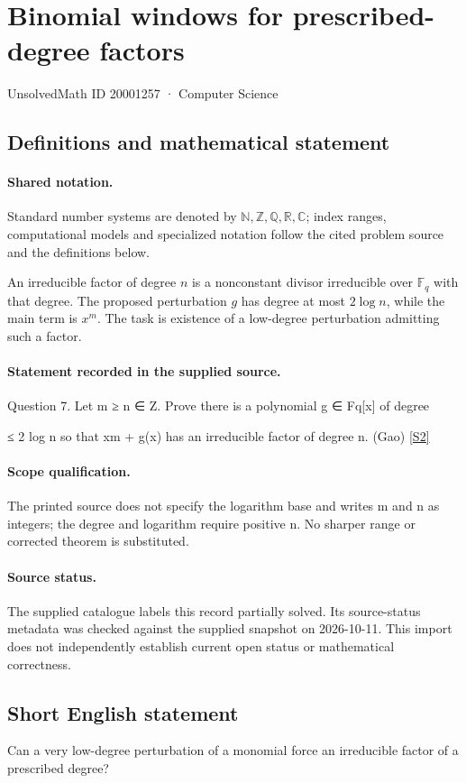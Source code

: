 \documentclass[11pt]{article}
\newcommand{\sref}[2]{\hyperlink{source:#1:#2}{[S#2]}}
\begin{document}
\setcounter{section}{20001256}
\section{Binomial windows for prescribed-degree factors}\label{20001257}
{\small\sffamily UnsolvedMath ID 20001257 · Computer Science}
\subsection{Definitions and mathematical statement}

\paragraph{Shared notation.}Standard number systems are denoted by $\mathbb N,\mathbb Z,\mathbb Q,\mathbb R,\mathbb C$; index ranges, computational models and specialized notation follow the cited problem source and the definitions below.


An irreducible factor of degree $n$ is a nonconstant divisor irreducible over $\mathbb F_q$ with that degree. The proposed perturbation $g$ has degree at most $2\log n$, while the main term is $x^m$. The task is existence of a low-degree perturbation admitting such a factor.
\paragraph{Statement recorded in the supplied source.}
Question 7. Let m ≥ n ∈ Z. Prove there is a polynomial g ∈ Fq[x] of degree

≤ 2 log n so that xm + g(x) has an irreducible factor of degree n. (Gao) \sref{20001257}{2}
\paragraph{Scope qualification.}
The printed source does not specify the logarithm base and writes m and n as integers; the degree and logarithm require positive n. No sharper range or corrected theorem is substituted.
\paragraph{Source status.}
The supplied catalogue labels this record partially solved. Its source-status metadata was checked against the supplied snapshot on 2026-10-11. This import does not independently establish current open status or mathematical correctness.
\subsection{Short English statement}
Can a very low-degree perturbation of a monomial force an irreducible factor of a prescribed degree?
\end{document}

